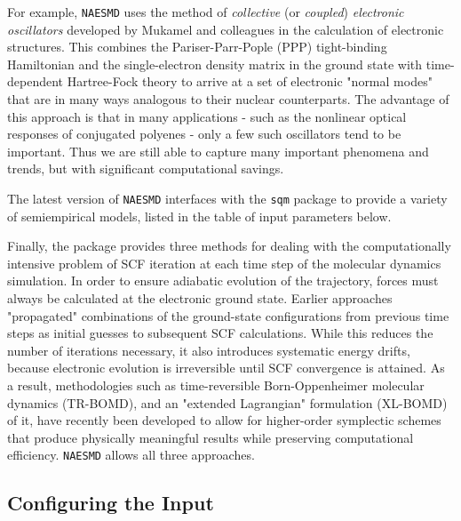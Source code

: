 \documentclass[12pt,letter,footinclude=true,headinclude=true,hyphens]{book} %
\begin{document}
    For example, \texttt{NAESMD} uses the method of \emph{collective} (or \emph{coupled}) \emph{electronic oscillators} developed by Mukamel and colleagues in the calculation of electronic structures. This combines the Pariser-Parr-Pople (PPP) tight-binding Hamiltonian and the single-electron density matrix in the ground state with time-dependent Hartree-Fock theory to arrive at a set of electronic "normal modes" that are in many ways analogous to their nuclear counterparts. The advantage of this approach is that in many applications - such as the nonlinear optical responses of conjugated polyenes - only a few such oscillators tend to be important. Thus we are still able to capture many important phenomena and trends, but with significant computational savings.
    
    The latest version of \texttt{NAESMD} interfaces with the \texttt{sqm} package to provide a variety of semiempirical models, listed in the table of input parameters below.
    
    Finally, the package provides three methods for dealing with the computationally intensive problem of SCF iteration at each time step of the molecular dynamics simulation. In order to ensure adiabatic evolution of the trajectory, forces must always be calculated at the electronic ground state. Earlier approaches "propagated" combinations of the ground-state configurations from previous time steps as initial guesses to subsequent SCF calculations. While this reduces the number of iterations necessary, it also introduces systematic energy drifts, because electronic evolution is irreversible until SCF convergence is attained. As a result, methodologies such as time-reversible Born-Oppenheimer molecular dynamics (TR-BOMD), and an "extended Lagrangian" formulation (XL-BOMD) of it, have recently been developed to allow for higher-order symplectic schemes that produce physically meaningful results while preserving computational efficiency. \texttt{NAESMD} allows all three approaches.     
    
    \subsection{Configuring the Input}
    \label{ground-state-input}
    
\end{document}
